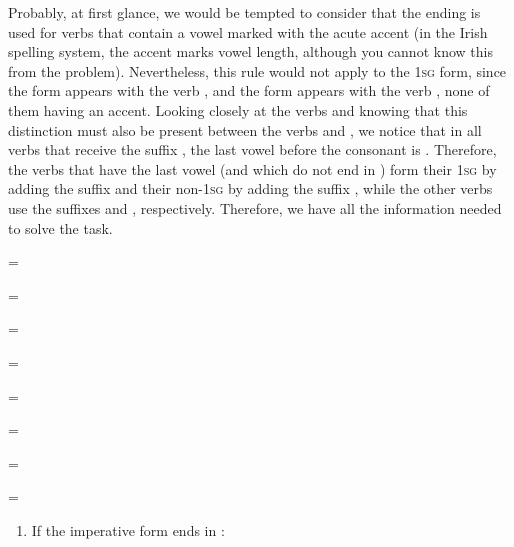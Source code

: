 \begin{refsection}
\begin{mysolution}
Probably, at first glance, we would be tempted to consider that the ending  is used for verbs that contain a vowel marked with the acute accent (in the Irish spelling system, the accent marks vowel length, although you cannot know this from the problem). Nevertheless, this rule would not apply to the 1\textsc{sg} form, since the form  appears with the verb , and the form  appears with the verb , none of them having an accent. Looking closely at the verbs and knowing that this distinction must also be present between the verbs  and , we notice that in all verbs that receive the suffix , the last vowel before the consonant is . Therefore, the verbs that have the last vowel  (and which do not end in ) form their 1\textsc{sg} by adding the suffix  and their non-1\textsc{sg} by adding the suffix , while the other verbs use the suffixes  and , respectively. Therefore, we have all the information needed to solve the task.

\begin{assgts}
\item
\begin{itemize}[leftmargin = 1em]
\begin{multicols}{2}
        \item[]  = 
        \item[]  = 
        \item[]  = 
        \item[]  = 
        \item[]  = 
        \item[]  = 
        \item[]  = 
        \item[]  = 
\end{multicols}\end{itemize}
\end{assgts}
\begin{enumerate}
\item If the imperative form ends in :


\end{enumerate}
\end{mysolution}
\end{refsection}
